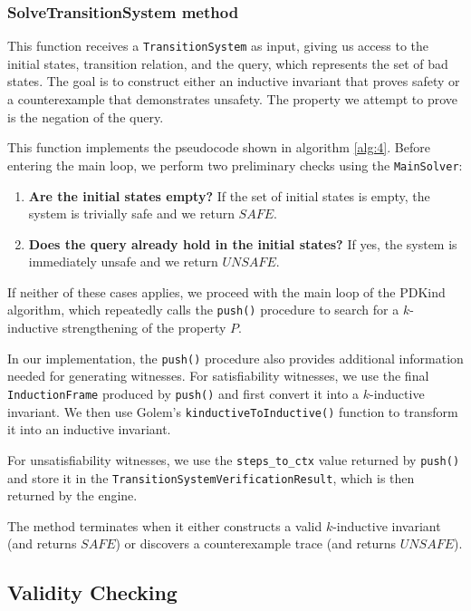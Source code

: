 \subsubsection{SolveTransitionSystem method}

\noindent This function receives a \texttt{TransitionSystem} as input, giving
us access to the initial states, transition relation, and the query, which
represents the set of bad states. The goal is to construct either an inductive
invariant that proves safety or a counterexample that demonstrates unsafety.
The property we attempt to prove is the negation of the query.

This function implements the pseudocode shown in algorithm \ref{alg:4}. Before entering the main loop, we perform two preliminary checks using the \texttt{MainSolver}:
\begin{enumerate}
    \item \textbf{Are the initial states empty?} If the set of initial states is empty, the system is trivially safe and we return \( SAFE \).
    \item \textbf{Does the query already hold in the initial states?} If yes, the system is immediately unsafe and we return \( UNSAFE \).
\end{enumerate}

If neither of these cases applies, we proceed with the main loop of the PDKind
algorithm, which repeatedly calls the \texttt{push()} procedure to search for a
\( k \)-inductive strengthening of the property \( P \).

In our implementation, the \texttt{push()} procedure also provides additional
information needed for generating witnesses. For satisfiability witnesses, we
use the final \texttt{InductionFrame} produced by \texttt{push()} and first
convert it into a \( k \)-inductive invariant. We then use Golem's
\texttt{kinductiveToInductive()} function to transform it into an inductive
invariant.

For unsatisfiability witnesses, we use the \texttt{steps\_to\_ctx} value
returned by \texttt{push()} and store it in the
\texttt{TransitionSystemVerificationResult}, which is then returned by the
engine.

The method terminates when it either constructs a valid \( k \)-inductive
invariant (and returns \( SAFE \)) or discovers a counterexample trace (and
returns \( UNSAFE \)).

\subsection{Validity Checking}

